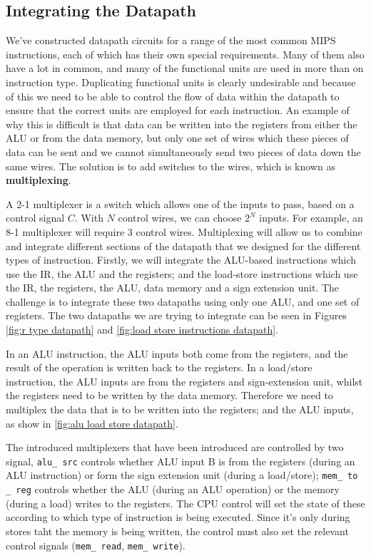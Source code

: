 \documentclass{article}
\begin{document}
	\subsection{Integrating the Datapath}
	We've constructed datapath circuits for a range of the most common MIPS instructions, each of which has their own special requirements. Many of them also have a lot in common, and many of the functional units are used in more than on instruction type. Duplicating functional units is clearly undesirable and because of this we need to be able to control the flow of data within the datapath to ensure that the correct units are employed for each instruction. An example of why this is difficult is that data can be written into the registers from either the ALU or from the data memory, but only one set of wires which these pieces of data can be sent and we cannot simultaneously send two pieces of data down the same wires. The solution is to add switches to the wires, which is known as \textbf{multiplexing}. 
	\par 
	A 2-1 multiplexer is a switch which allows one of the inputs to pass, based on a control signal $C$. With $N$ control wires, we can choose $2^{N}$ inputs. For example, an 8-1 multiplexer will require 3 control wires. Multiplexing will allow us to combine and integrate different sections of the datapath that we designed for the different types of instruction. Firstly, we will integrate the ALU-based instructions which use the IR, the ALU and the registers; and the load-store instructions which use the IR, the registers, the ALU, data memory and a sign extension unit. The challenge is to integrate these two datapaths using only one ALU, and one set of registers. The two datapaths we are trying to integrate can be seen in Figures \ref{fig:r type datapath} and \ref{fig:load store instructions datapath}.
	
	\par 
	In an ALU instruction, the ALU inputs both come from the registers, and the result of the operation is written back to the registers. In a load/store instruction, the ALU inputs are from the registers and sign-extension unit, whilst the registers need to be written by the data memory. Therefore we need to multiplex the data that is to be written into the registers; and the ALU inputs, as show in \ref{fig:alu load store datapath}. 
	
	\par 
	The introduced multiplexers that have been introduced are controlled by two signal, \texttt{alu\_ src} controls whether ALU input B is from the registers (during an ALU instruction) or form the sign extension unit (during a load/store); \texttt{mem\_ to \_ reg} controls whether the ALU (during an ALU operation) or the memory (during a load) writes to the registers. The CPU control will set the state of these according to which type of instruction is being executed. Since it's only during stores taht the memory is being written, the control must also set the relevant control signals (\texttt{mem\_ read}, \texttt{mem\_ write}).
	
\end{document}
